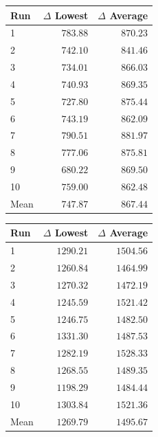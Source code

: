 \begin{table}[H]
    \centering
    \begin{minipage}[t]{0.48\textwidth}
        \centering
        \label{tab:gain-uniform-full}
        \small
        \setlength{\tabcolsep}{4pt}
        \begin{tabular}{lrr}
            \toprule
            \textbf{Run} & \textbf{$\Delta$ Lowest} & \textbf{$\Delta$ Average} \\
            \midrule
            1 & $783.88$ & $870.23$ \\
            2 & $742.10$ & $841.46$ \\
            3 & $734.01$ & $866.03$ \\
            4 & $740.93$ & $869.35$ \\
            5 & $727.80$ & $875.44$ \\
            6 & $743.19$ & $862.09$ \\
            7 & $790.51$ & $881.97$ \\
            8 & $777.06$ & $875.81$ \\
            9 & $680.22$ & $869.50$ \\
            10 & $759.00$ & $862.48$ \\
            \midrule
            Mean & $747.87$ & $867.44$ \\
            \bottomrule
        \end{tabular}
    \end{minipage}
    \hfill
    \begin{minipage}[t]{0.48\textwidth}
        \centering
        \label{tab:gain-normal-full}
        \small
        \setlength{\tabcolsep}{4pt}
        \begin{tabular}{lrr}
            \toprule
            \textbf{Run} & \textbf{$\Delta$ Lowest} & \textbf{$\Delta$ Average} \\
            \midrule
            1 & $1290.21$ & $1504.56$ \\
            2 & $1260.84$ & $1464.99$ \\
            3 & $1270.32$ & $1472.19$ \\
            4 & $1245.59$ & $1521.42$ \\
            5 & $1246.75$ & $1482.50$ \\
            6 & $1331.30$ & $1487.53$ \\
            7 & $1282.19$ & $1528.33$ \\
            8 & $1268.55$ & $1489.35$ \\
            9 & $1198.29$ & $1484.44$ \\
            10 & $1303.84$ & $1521.36$ \\
            \midrule
            Mean & $1269.79$ & $1495.67$ \\
            \bottomrule
        \end{tabular}
    \end{minipage}
\end{table}

